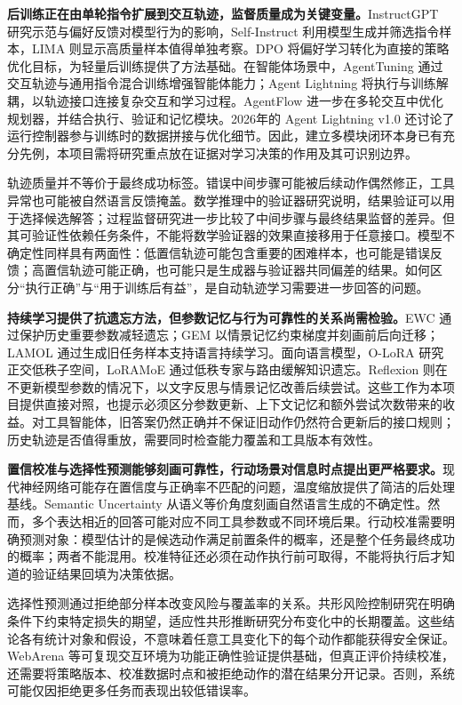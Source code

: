 \textbf{后训练正在由单轮指令扩展到交互轨迹，监督质量成为关键变量。}InstructGPT 研究示范与偏好反馈对模型行为的影响\cite{instructgpt}，Self-Instruct 利用模型生成并筛选指令样本\cite{selfinstruct}，LIMA 则显示高质量样本值得单独考察\cite{lima}。DPO 将偏好学习转化为直接的策略优化目标，为轻量后训练提供了方法基础\cite{dpo}。在智能体场景中，AgentTuning 通过交互轨迹与通用指令混合训练增强智能体能力\cite{agenttuning}；Agent Lightning 将执行与训练解耦，以轨迹接口连接复杂交互和学习过程\cite{lightning}。AgentFlow 进一步在多轮交互中优化规划器，并结合执行、验证和记忆模块\cite{agentflow}。2026年的 Agent Lightning v1.0 还讨论了运行控制器参与训练时的数据拼接与优化细节\cite{lightningv1}。因此，建立多模块闭环本身已有充分先例，本项目需将研究重点放在证据对学习决策的作用及其可识别边界。

轨迹质量并不等价于最终成功标签。错误中间步骤可能被后续动作偶然修正，工具异常也可能被自然语言反馈掩盖。数学推理中的验证器研究说明，结果验证可以用于选择候选解答\cite{verifiers}；过程监督研究进一步比较了中间步骤与最终结果监督的差异\cite{stepverify}。但其可验证性依赖任务条件，不能将数学验证器的效果直接移用于任意接口。模型不确定性同样具有两面性：低置信轨迹可能包含重要的困难样本，也可能是错误反馈；高置信轨迹可能正确，也可能只是生成器与验证器共同偏差的结果。如何区分“执行正确”与“用于训练后有益”，是自动轨迹学习需要进一步回答的问题。

\textbf{持续学习提供了抗遗忘方法，但参数记忆与行为可靠性的关系尚需检验。}EWC 通过保护历史重要参数减轻遗忘\cite{ewc}；GEM 以情景记忆约束梯度并刻画前后向迁移\cite{gem}；LAMOL 通过生成旧任务样本支持语言持续学习\cite{lamol}。面向语言模型，O-LoRA 研究正交低秩子空间，LoRAMoE 通过低秩专家与路由缓解知识遗忘\cite{olora,loramoe}。Reflexion 则在不更新模型参数的情况下，以文字反思与情景记忆改善后续尝试\cite{reflexion}。这些工作为本项目提供直接对照，也提示必须区分参数更新、上下文记忆和额外尝试次数带来的收益。对工具智能体，旧答案仍然正确并不保证旧动作仍然符合更新后的接口规则；历史轨迹是否值得重放，需要同时检查能力覆盖和工具版本有效性。

\textbf{置信校准与选择性预测能够刻画可靠性，行动场景对信息时点提出更严格要求。}现代神经网络可能存在置信度与正确率不匹配的问题，温度缩放提供了简洁的后处理基线\cite{calibration}。Semantic Uncertainty 从语义等价角度刻画自然语言生成的不确定性\cite{semantic}。然而，多个表达相近的回答可能对应不同工具参数或不同环境后果。行动校准需要明确预测对象：模型估计的是候选动作满足前置条件的概率，还是整个任务最终成功的概率；两者不能混用。校准特征还必须在动作执行前可取得，不能将执行后才知道的验证结果回填为决策依据。

选择性预测通过拒绝部分样本改变风险与覆盖率的关系\cite{selective}。共形风险控制研究在明确条件下约束特定损失的期望，适应性共形推断研究分布变化中的长期覆盖\cite{conformalrisk,adaptiveconformal}。这些结论各有统计对象和假设，不意味着任意工具变化下的每个动作都能获得安全保证。WebArena 等可复现交互环境为功能正确性验证提供基础\cite{webarena}，但真正评价持续校准，还需要将策略版本、校准数据时点和被拒绝动作的潜在结果分开记录。否则，系统可能仅因拒绝更多任务而表现出较低错误率。

